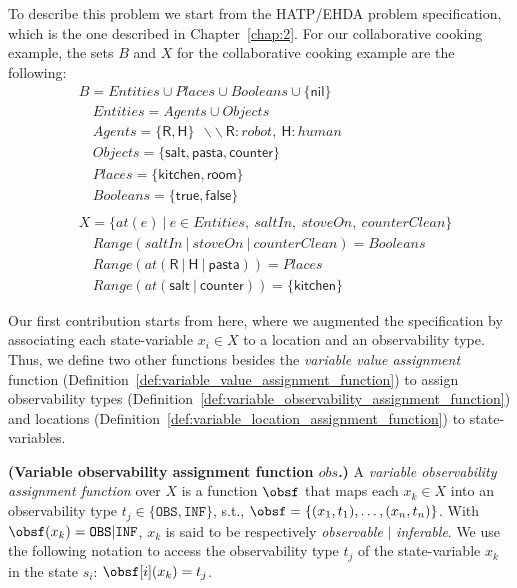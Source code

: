 To describe this problem we start from the HATP/EHDA problem specification, which is the one described in Chapter~\ref{chap:2}. For our collaborative cooking example, the sets $B$ and $X$ for the collaborative cooking example are the following:
{\small
\begin{align*}
&B           = Entities \cup Places \cup Booleans \cup \{\textsf{nil}\} \\
&\quad Entities    = Agents \cup Objects\\
&\quad Agents      = \{ \textsf{R}, \textsf{H} \} ~~ \backslash\backslash~\textsf{R}:robot,~\textsf{H}:human\\
&\quad Objects     = \{ \textsf{salt}, \textsf{pasta}, \textsf{counter} \}\\
&\quad Places      = \{ \textsf{kitchen}, \textsf{room} \}\\
&\quad Booleans    = \{ \textsf{true},\textsf{false} \}\\
&\\
&X = \{ at(e)~|~ e \in Entities, ~saltIn, ~stoveOn, ~counterClean  \}\\
&\quad \textit{Range}(saltIn ~|~ stoveOn ~|~ counterClean)=Booleans\\
&\quad \textit{Range}(at(\textsf{R} ~|~ \textsf{H} ~|~ \textsf{pasta})) = Places\\
&\quad \textit{Range}(at(\textsf{salt} ~|~ \textsf{counter})) = \{ \textsf{kitchen} \}
\end{align*}
}

Our first contribution starts from here, where we augmented the specification by associating each state-variable $x_i \in X$ to a location and an observability type. Thus, we define two other functions besides the \textit{variable value assignment} function (Definition~\ref{def:variable_value_assignment_function}) to assign observability types (Definition~\ref{def:variable_observability_assignment_function}) and locations (Definition~\ref{def:variable_location_assignment_function}) to state-variables.

\begin{definition}
    \textbf{(Variable observability assignment function $obs$.)} A \emph{variable observability assignment function} over $X$ is a function $\obsf$ that maps each $x_k \in X$ into an observability type $t_j \in \{ \texttt{OBS},  \texttt{INF} \}$, s.t., $\obsf = \{ (x_1,t_1), \ldots , (x_n,t_n) \}$. With $\obsf(x_k) = \texttt{OBS} | \texttt{INF}$, $x_k$ is said to be respectively \textit{observable} $|$ \textit{inferable}.
    We use the following notation to access the observability type $t_j$ of the state-variable $x_k$ in the state $s_i$: $\obsf[i](x_k) = t_j$.
    \label{def:variable_observability_assignment_function}
\end{definition}

